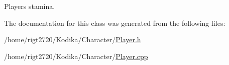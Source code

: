Players stamina. 



The documentation for this class was generated from the following files\-:\begin{DoxyCompactItemize}
\item 
/home/rigt2720/\-Kodika/\-Character/\hyperlink{Player_8h}{Player.\-h}\item 
/home/rigt2720/\-Kodika/\-Character/\hyperlink{Player_8cpp}{Player.\-cpp}\end{DoxyCompactItemize}
